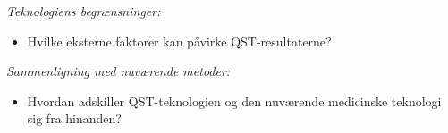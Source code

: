 \textit{Teknologiens begrænsninger:}
\begin{itemize}
	\item Hvilke eksterne faktorer kan påvirke QST-resultaterne?
\end{itemize}

\textit{Sammenligning med nuværende metoder:}
\begin{itemize}
	\item Hvordan adskiller QST-teknologien og den nuværende medicinske teknologi sig fra hinanden? %
\end{itemize}
%
